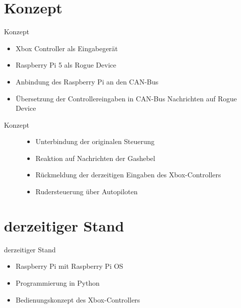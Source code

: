 \documentclass[usenames, dvipsnames, aspectratio=75]{beamer}
\begin{document}

\section{Konzept}
\begin{frame}{Konzept}
    \begin{itemize}
        \item Xbox Controller als Eingabegerät
        \item Raspberry Pi 5 als Rogue Device
        \item Anbindung des Raspberry Pi an den CAN-Bus
        \item Übersetzung der Controllereingaben in CAN-Bus Nachrichten auf Rogue Device
    \end{itemize}
\end{frame}

\begin{frame}{Konzept}
    \begin{figure}
        \begin{itemize}
            \item Unterbindung der originalen Steuerung
            \item Reaktion auf Nachrichten der Gashebel
            \item Rückmeldung der derzeitigen Eingaben des Xbox-Controllers
            \item Rudersteuerung über Autopiloten
        \end{itemize}
    \end{figure}
\end{frame}

\section{derzeitiger Stand}

\begin{frame}{derzeitiger Stand}
    \begin{itemize}
        \item Raspberry Pi mit Raspberry Pi OS
        \item Programmierung in Python
        \item Bedienungskonzept des Xbox-Controllers
    \end{itemize}
\end{frame}
\end{document}
